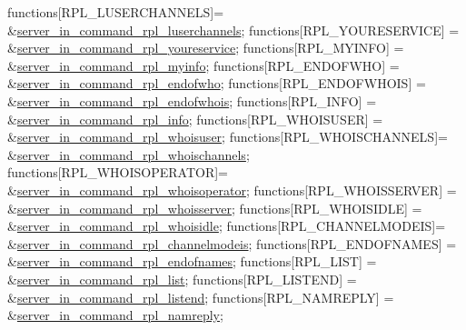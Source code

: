 \begin{DoxyCode}
functions[RPL\_LUSERCHANNELS]= &\hyperlink{G-2313-06-P2__client__function__handlers_8h_ae53c29cff5b1b8b3981be92c317cf29d}{server\_in\_command\_rpl\_luserchannels};
functions[RPL\_YOURESERVICE] = &\hyperlink{G-2313-06-P2__client__function__handlers_8h_a9a54a1989e86596904bc4d1c2618ba84}{server\_in\_command\_rpl\_youreservice};
functions[RPL\_MYINFO]       = &\hyperlink{G-2313-06-P2__client__function__handlers_8h_aa4c4d377b1cde9f0b40997a54c81c3de}{server\_in\_command\_rpl\_myinfo};
functions[RPL\_ENDOFWHO]     = &\hyperlink{G-2313-06-P2__client__function__handlers_8h_a441993de1d4be974fab21e17aacc553e}{server\_in\_command\_rpl\_endofwho};
functions[RPL\_ENDOFWHOIS]   = &\hyperlink{G-2313-06-P2__client__function__handlers_8h_a56185c77cfea8620c1ce413a44865bc4}{server\_in\_command\_rpl\_endofwhois};
functions[RPL\_INFO]         = &\hyperlink{G-2313-06-P2__client__function__handlers_8h_a6477df39f199931be3274e311a18b276}{server\_in\_command\_rpl\_info};
functions[RPL\_WHOISUSER]    = &\hyperlink{G-2313-06-P2__client__function__handlers_8h_af2190c9ca68abe019cde6f3a18e380c2}{server\_in\_command\_rpl\_whoisuser};
functions[RPL\_WHOISCHANNELS]= &\hyperlink{G-2313-06-P2__client__function__handlers_8h_a7ed4d1bd7f485fe7c6d26bd1d8eef662}{server\_in\_command\_rpl\_whoischannels};
functions[RPL\_WHOISOPERATOR]= &\hyperlink{G-2313-06-P2__client__function__handlers_8h_a890fb67530ca5c1f5c14da877fc9ba21}{server\_in\_command\_rpl\_whoisoperator};
functions[RPL\_WHOISSERVER]  = &\hyperlink{G-2313-06-P2__client__function__handlers_8h_a27bc970f66b7e5a2f3806853c3fa156f}{server\_in\_command\_rpl\_whoisserver};
functions[RPL\_WHOISIDLE]    = &\hyperlink{G-2313-06-P2__client__function__handlers_8h_ada14de5a081899ca2b5eccbfb9779d62}{server\_in\_command\_rpl\_whoisidle};
functions[RPL\_CHANNELMODEIS]= &\hyperlink{G-2313-06-P2__client__function__handlers_8h_a23ae57a558e401f83bc03209efb34be2}{server\_in\_command\_rpl\_channelmodeis};
functions[RPL\_ENDOFNAMES]   = &\hyperlink{G-2313-06-P2__client__function__handlers_8h_a11fdd753a098bb69dc7ca93a89433abb}{server\_in\_command\_rpl\_endofnames};
functions[RPL\_LIST]         = &\hyperlink{G-2313-06-P2__client__function__handlers_8h_a032cc47903f14a4fbdcec9e54f6a8e4a}{server\_in\_command\_rpl\_list};
functions[RPL\_LISTEND]      = &\hyperlink{G-2313-06-P2__client__function__handlers_8h_ad4a1e3d492ae6907a5e15e92cb9b69f7}{server\_in\_command\_rpl\_listend};
functions[RPL\_NAMREPLY]     = &\hyperlink{G-2313-06-P2__client__function__handlers_8h_a770ed57ba6c48c4a349208439e3f19ef}{server\_in\_command\_rpl\_namreply};
\end{DoxyCode}
 ~\newline
